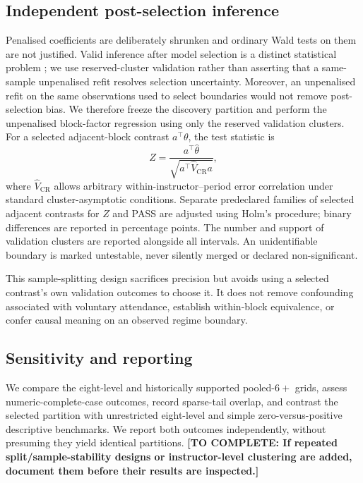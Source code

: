 \documentclass[11pt]{article}
\newcommand{\pending}[1]{\textbf{[TO COMPLETE: #1]}}
\begin{document}
\subsection{Independent post-selection inference}
Penalised coefficients are deliberately shrunken and ordinary Wald tests on them are not justified. Valid inference after model selection is a distinct statistical problem \citep{lee2016postselection}; we use reserved-cluster validation rather than asserting that a same-sample unpenalised refit resolves selection uncertainty. Moreover, an unpenalised refit on the same observations used to select boundaries would not remove post-selection bias. We therefore freeze the discovery partition and perform the unpenalised block-factor regression using only the reserved validation clusters. For a selected adjacent-block contrast $a^\top\theta$, the test statistic is
\begin{equation}
Z=\frac{a^\top\widehat{\theta}}{\sqrt{a^\top\widehat V_{\mathrm{CR}}a}},
\end{equation}
where $\widehat V_{\mathrm{CR}}$ allows arbitrary within-instructor--period error correlation under standard cluster-asymptotic conditions. Separate predeclared families of selected adjacent contrasts for $Z$ and PASS are adjusted using Holm's procedure; binary differences are reported in percentage points. The number and support of validation clusters are reported alongside all intervals. An unidentifiable boundary is marked untestable, never silently merged or declared non-significant.

This sample-splitting design sacrifices precision but avoids using a selected contrast's own validation outcomes to choose it. It does not remove confounding associated with voluntary attendance, establish within-block equivalence, or confer causal meaning on an observed regime boundary.

\subsection{Sensitivity and reporting}
We compare the eight-level and historically supported pooled-$6+$ grids, assess numeric-complete-case outcomes, record sparse-tail overlap, and contrast the selected partition with unrestricted eight-level and simple zero-versus-positive descriptive benchmarks. We report both outcomes independently, without presuming they yield identical partitions. \pending{If repeated split/sample-stability designs or instructor-level clustering are added, document them before their results are inspected.}
\end{document}
